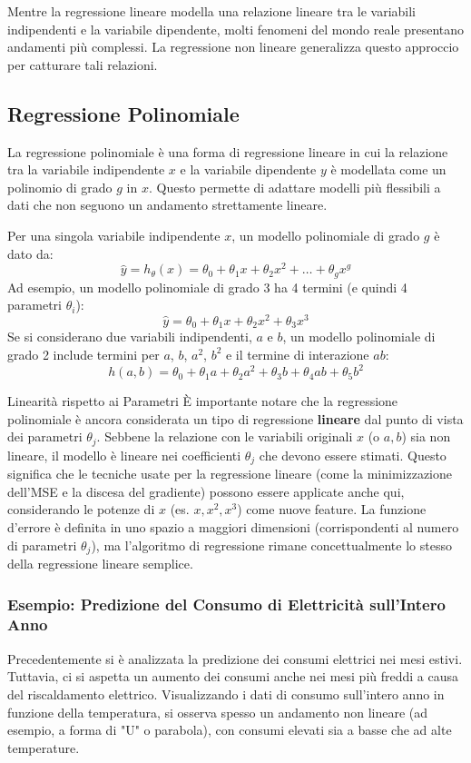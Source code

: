 \documentclass{article}
\begin{document}
Mentre la regressione lineare modella una relazione lineare tra le variabili indipendenti e la variabile dipendente, molti fenomeni del mondo reale presentano andamenti più complessi. La regressione non lineare generalizza questo approccio per catturare tali relazioni.

\subsection{Regressione Polinomiale}
La regressione polinomiale è una forma di regressione lineare in cui la relazione tra la variabile indipendente $x$ e la variabile dipendente $y$ è modellata come un polinomio di grado $g$ in $x$. Questo permette di adattare modelli più flessibili a dati che non seguono un andamento strettamente lineare.

Per una singola variabile indipendente $x$, un modello polinomiale di grado $g$ è dato da:
$$ \hat{y} = h_{\theta}(x) = \theta_0 + \theta_1 x + \theta_2 x^2 + \dots + \theta_g x^g $$
Ad esempio, un modello polinomiale di grado 3 ha 4 termini (e quindi 4 parametri $\theta_i$):
$$ \hat{y} = \theta_0 + \theta_1 x + \theta_2 x^2 + \theta_3 x^3 $$
Se si considerano due variabili indipendenti, $a$ e $b$, un modello polinomiale di grado 2 include termini per $a$, $b$, $a^2$, $b^2$ e il termine di interazione $ab$:
$$ h(a,b) = \theta_0 + \theta_1 a + \theta_2 a^2 + \theta_3 b + \theta_4 ab + \theta_5 b^2 $$

\begin{notebox}{Linearità rispetto ai Parametri}
    È importante notare che la regressione polinomiale è ancora considerata un tipo di regressione \textbf{lineare} dal punto di vista dei parametri $\theta_j$. Sebbene la relazione con le variabili originali $x$ (o $a, b$) sia non lineare, il modello è lineare nei coefficienti $\theta_j$ che devono essere stimati. Questo significa che le tecniche usate per la regressione lineare (come la minimizzazione dell'MSE e la discesa del gradiente) possono essere applicate anche qui, considerando le potenze di $x$ (es. $x, x^2, x^3$) come nuove feature. La funzione d'errore è definita in uno spazio a maggiori dimensioni (corrispondenti al numero di parametri $\theta_j$), ma l'algoritmo di regressione rimane concettualmente lo stesso della regressione lineare semplice.
\end{notebox}

\subsubsection{Esempio: Predizione del Consumo di Elettricità sull'Intero Anno}
Precedentemente si è analizzata la predizione dei consumi elettrici nei mesi estivi. Tuttavia, ci si aspetta un aumento dei consumi anche nei mesi più freddi a causa del riscaldamento elettrico. Visualizzando i dati di consumo sull'intero anno in funzione della temperatura, si osserva spesso un andamento non lineare (ad esempio, a forma di "U" o parabola), con consumi elevati sia a basse che ad alte temperature.
\end{document}
